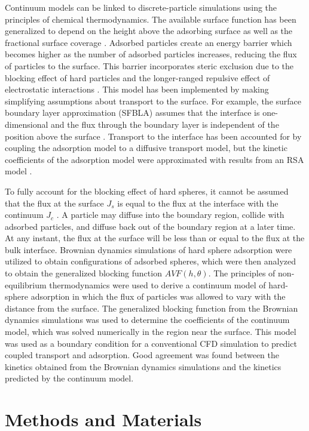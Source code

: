 Continuum models can be linked to discrete-particle simulations using
the principles of chemical thermodynamics. The available surface function
has been generalized to depend on the height above the adsorbing surface
as well as the fractional surface coverage \cite{Adamczyk1999}. Adsorbed
particles create an energy barrier which becomes higher as the number
of adsorbed particles increases, reducing the flux of particles to
the surface. This barrier incorporates steric exclusion due to the
blocking effect of hard particles and the longer-ranged repulsive
effect of electrostatic interactions \cite{Adamczyk2000}. This model
has been implemented by making simplifying assumptions about transport
to the surface. For example, the surface boundary layer approximation
(SFBLA) assumes that the interface is one-dimensional and the flux
through the boundary layer is independent of the position above the
surface \cite{Adamczyk1999a}. Transport to the interface has been
accounted for by coupling the adsorption model to a diffusive transport
model, but the kinetic coefficients of the adsorption model were approximated
with results from an RSA model \cite{Adamczyk2000}. 

To fully account for the blocking effect of hard spheres, it cannot
be assumed that the flux at the surface $J_{s}$ is equal to the flux
at the interface with the continuum $J_{c}$ . A particle may diffuse
into the boundary region, collide with adsorbed particles, and diffuse
back out of the boundary region at a later time. At any instant, the
flux at the surface will be less than or equal to the flux at the
bulk interface. Brownian dynamics simulations of hard sphere adsorption
were utilized to obtain configurations of adsorbed spheres, which
were then analyzed to obtain the generalized blocking function $AVF\left(h,\theta\right)$.
The principles of non-equilibrium thermodynamics were used to derive
a continuum model of hard-sphere adsorption in which the flux of particles
was allowed to vary with the distance from the surface. The generalized
blocking function from the Brownian dynamics simulations was used
to determine the coefficients of the continuum model, which was solved
numerically in the region near the surface. This model was used as
a boundary condition for a conventional CFD simulation to predict
coupled transport and adsorption. Good agreement was found between
the kinetics obtained from the Brownian dynamics simulations and the
kinetics predicted by the continuum model.


\section{Methods and Materials}


